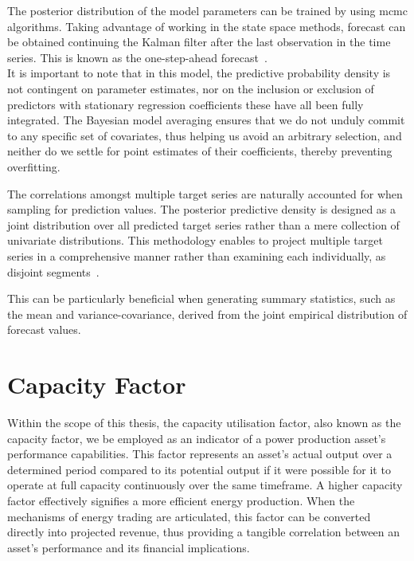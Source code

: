     The posterior distribution of the model parameters can be trained by using \gls{mcmc} algorithms.
    Taking advantage of working in the state space methods, forecast can be obtained continuing the Kalman filter after
    the last observation in the time series.
    This is known as the one-step-ahead forecast~\cite{durbin_time_2012}. \\

    It is important to note that in this model, the predictive probability density is not contingent on parameter estimates,
    nor on the inclusion or exclusion of predictors with stationary regression coefficients these have all been fully integrated.
    The Bayesian model averaging ensures that we do not unduly commit to any specific set of covariates,
    thus helping us avoid an arbitrary selection, and neither do we settle for point estimates of their coefficients,
    thereby preventing overfitting.

    The correlations amongst multiple target series are naturally accounted for when sampling for prediction values.
    The posterior predictive density is designed as a joint distribution over all predicted target series rather than a
    mere collection of univariate distributions.
    This methodology enables to project multiple target series in a comprehensive manner rather than examining each individually,
    as disjoint segments~\cite{qiu_multivariate_2018}.

    This can be particularly beneficial when generating summary statistics, such as the mean and variance-covariance,
    derived from the joint empirical distribution of forecast values.

\section{Capacity Factor}
    \label{sec:capacity_factor}

    Within the scope of this thesis, the capacity utilisation factor, also known as the capacity factor, we be employed
    as an indicator of a power production asset's performance capabilities.
    This factor represents an asset's actual output over a determined period compared to its potential output
    if it were possible for it to operate at full capacity continuously over the same timeframe.
    A higher capacity factor effectively signifies a more efficient energy production.
    When the mechanisms of energy trading are articulated, this factor can be converted directly into projected revenue,
    thus providing a tangible correlation between an asset’s performance and its financial implications.

